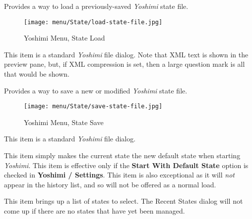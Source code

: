    \setcounter{ItemCounter}{0}      %

   Provides a way to load a previously-saved \textsl{Yoshimi} state file.

\begin{figure}[H]
   \centering
   \texttt{[image: menu/State/load-state-file.jpg]}
   \caption{Yoshimi Menu, State Load}
   \label{fig:yoshimi_menu_state_load}
\end{figure}

   This item is a standard \textsl{Yoshimi} file dialog.
   Note that XML text is shown in the preview pane, but, if XML compression is
   set, then a large question mark is all that would be shown.

   Provides a way to save a new or modified \textsl{Yoshimi} state file.

\begin{figure}[H]
   \centering
   \texttt{[image: menu/State/save-state-file.jpg]}
   \caption{Yoshimi Menu, State Save}
   \label{fig:yoshimi_menu_state_save}
\end{figure}

   This item is a standard \textsl{Yoshimi} file dialog.

   This item simply makes the current state the new default state when starting
   \textsl{Yoshimi}.
   This item is effective only if the \textbf{Start With Default State}
   option is checked in \textbf{Yoshimi / Settings}. This item is also
   exceptional as it will \textsl{not} appear in the history list, and so
   will not be offered as a normal load.

   This item brings up a list of states to select.
   The Recent States dialog will not come up if there are no states that have
   yet been managed.

